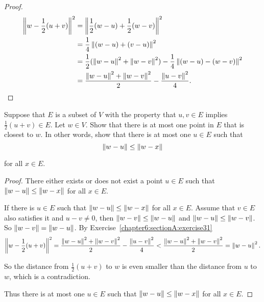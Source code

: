 \begin{proof}
    \begin{align*}
        \left\Vert{w - \frac{1}{2}(u + v)}\right\Vert^{2} & = \left\Vert{\frac{1}{2}(w - u) + \frac{1}{2}(w - v)}\right\Vert^{2}                                         \\
                                          & = \frac{1}{4}\left\Vert{(w - u) + (v - u)}\right\Vert^{2}                                                    \\
                                          & = \frac{1}{2}(\left\Vert{w - u}\right\Vert^{2} + \left\Vert{w - v}\right\Vert^{2}) - \frac{1}{4}\left\Vert{(w - u) - (w - v)}\right\Vert^{2} \\
                                          & = \frac{\left\Vert{w - u}\right\Vert^{2} + \left\Vert{w - v}\right\Vert^{2}}{2} - \frac{\left\Vert{u - v}\right\Vert^{2}}{4}.
    \end{align*}
\end{proof}
\newpage

\begin{exercise}
    Suppose that $E$ is a subset of $V$ with the property that $u, v\in E$ implies $\frac{1}{2}(u + v)\in E$. Let $w\in V$. Show that there is at most one point in $E$ that is closest to $w$. In other words, show that there is at most one $u\in E$ such that
    \[
        \left\Vert{w - u}\right\Vert\leq \left\Vert{w - x}\right\Vert
    \]

    for all $x\in E$.
\end{exercise}

\begin{proof}
    There either exists or does not exist a point $u\in E$ such that $\left\Vert{w - u}\right\Vert\leq \left\Vert{w - x}\right\Vert$ for all $x\in E$.

    If there is $u\in E$ such that $\left\Vert{w - u}\right\Vert\leq \left\Vert{w - x}\right\Vert$ for all $x\in E$. Assume that $v\in E$ also satisfies it and $u - v\ne 0$, then $\left\Vert{w - v}\right\Vert\leq \left\Vert{w - u}\right\Vert$ and $\left\Vert{w - u}\right\Vert\leq \left\Vert{w - v}\right\Vert$. So $\left\Vert{w - v}\right\Vert = \left\Vert{w - u}\right\Vert$. By Exercise~\ref{chapter6:sectionA:exercise31}
    \[
        \left\Vert{w - \frac{1}{2}(u + v)}\right\Vert^{2} = \frac{\left\Vert{w - u}\right\Vert^{2} + \left\Vert{w - v}\right\Vert^{2}}{2} - \frac{\left\Vert{u - v}\right\Vert^{2}}{4} < \frac{\left\Vert{w - u}\right\Vert^{2} + \left\Vert{w - v}\right\Vert^{2}}{2} = \left\Vert{w - u}\right\Vert^{2}.
    \]

    So the distance from $\frac{1}{2}(u + v)$ to $w$ is even smaller than the distance from $u$ to $w$, which is a contradiction.

    Thus there is at most one $u\in E$ such that $\left\Vert{w - u}\right\Vert\leq \left\Vert{w - x}\right\Vert$ for all $x\in E$.
\end{proof}
\newpage


